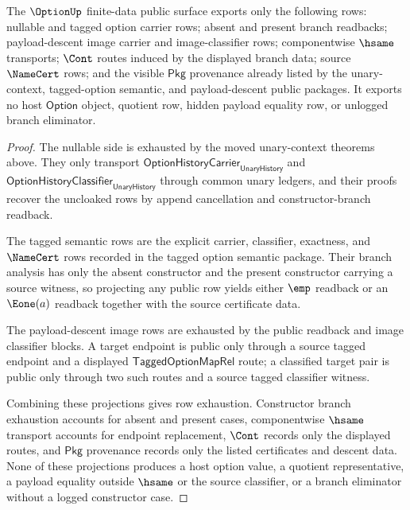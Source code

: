 \begin{theorem}
\label{thm:option-finite-data-scoped-row-exhaustion}
The $\OptionUp$ finite-data public surface exports only the following rows:
nullable and tagged option carrier rows; absent and present branch readbacks;
payload-descent image carrier and image-classifier rows; componentwise
$\hsame$ transports; $\Cont$ routes induced by the displayed branch data;
source $\NameCert$ rows; and the visible $\mathsf{Pkg}$ provenance already
listed by the unary-context, tagged-option semantic, and payload-descent public
packages. It exports no host $\mathsf{Option}$ object, quotient row, hidden
payload equality row, or unlogged branch eliminator.
\end{theorem}
\begin{proof}
The nullable side is exhausted by the moved unary-context theorems above. They
only transport $\mathsf{OptionHistoryCarrier}_{\mathsf{UnaryHistory}}$ and
$\mathsf{OptionHistoryClassifier}_{\mathsf{UnaryHistory}}$ through common
unary ledgers, and their proofs recover the uncloaked rows by append
cancellation and constructor-branch readback.

The tagged semantic rows are the explicit carrier, classifier, exactness, and
$\NameCert$ rows recorded in the tagged option semantic package. Their branch
analysis has only the absent constructor and the present constructor carrying
a source witness, so projecting any public row yields either $\emp$ readback
or an $\Eone(a)$ readback together with the source certificate data.

The payload-descent image rows are exhausted by the public readback and image
classifier blocks. A target endpoint is public only through a source tagged
endpoint and a displayed $\mathsf{TaggedOptionMapRel}$ route; a classified
target pair is public only through two such routes and a source tagged
classifier witness.

Combining these projections gives row exhaustion. Constructor branch
exhaustion accounts for absent and present cases, componentwise $\hsame$
transport accounts for endpoint replacement, $\Cont$ records only the displayed
routes, and $\mathsf{Pkg}$ provenance records only the listed certificates and
descent data. None of these projections produces a host option value, a
quotient representative, a payload equality outside $\hsame$ or the source
classifier, or a branch eliminator without a logged constructor case.
\end{proof}
